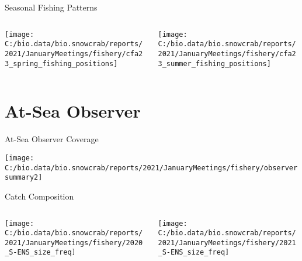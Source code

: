 \documentclass[
  ignorenonframetext,
]{beamer}
\begin{document}
\begin{frame}{Seasonal Fishing Patterns}
\protect\hypertarget{seasonal-fishing-patterns}{}
\begin{columns}[T]
\begin{column}{0.48\textwidth}
\begin{flushleft}\texttt{[image: C:/bio.data/bio.snowcrab/reports/2021/JanuaryMeetings/fishery/cfa23\_spring\_fishing\_positions]} \end{flushleft}
\end{column}

\begin{column}{0.48\textwidth}
\begin{flushleft}\texttt{[image: C:/bio.data/bio.snowcrab/reports/2021/JanuaryMeetings/fishery/cfa23\_summer\_fishing\_positions]} \end{flushleft}
\end{column}
\end{columns}
\end{frame}

\hypertarget{at-sea-observer}{%
\section{At-Sea Observer}\label{at-sea-observer}}

\begin{frame}{At-Sea Observer Coverage}
\protect\hypertarget{at-sea-observer-coverage}{}
\begin{center}\texttt{[image: C:/bio.data/bio.snowcrab/reports/2021/JanuaryMeetings/fishery/observersummary2]} \end{center}
\end{frame}

\begin{frame}{Catch Composition}
\protect\hypertarget{catch-composition}{}
\begin{columns}[T]
\begin{column}{0.48\textwidth}
\begin{center}\texttt{[image: C:/bio.data/bio.snowcrab/reports/2021/JanuaryMeetings/fishery/2020\_S-ENS\_size\_freq]} \end{center}
\end{column}

\begin{column}{0.48\textwidth}
\begin{center}\texttt{[image: C:/bio.data/bio.snowcrab/reports/2021/JanuaryMeetings/fishery/2021\_S-ENS\_size\_freq]} \end{center}
\end{column}
\end{columns}
\end{frame}
\end{document}
